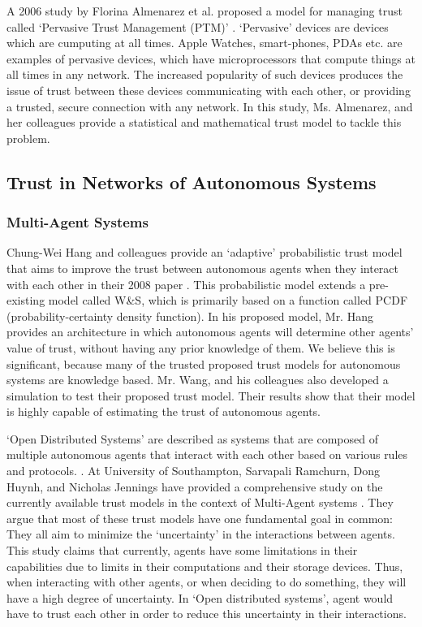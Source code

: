 \documentclass[runningheads,a4paper]{llncs}
\begin{document}
A 2006 study by Florina Almenarez et al. proposed a model for managing trust called `Pervasive Trust Management (PTM)' \cite{almenarez2006developing}. `Pervasive' devices are devices which are cumputing at all times. Apple Watches, smart-phones, PDAs etc. are examples of pervasive devices, which have microprocessors that compute things at all times in any network. The increased popularity of such devices produces the issue of trust between these devices communicating with each other, or providing a trusted, secure connection with any network. In this study, Ms. Almenarez, and her colleagues provide a statistical and mathematical trust model to tackle this problem.
\newpage
\subsection{Trust in Networks of Autonomous Systems}
\subsubsection{Multi-Agent Systems}
Chung-Wei Hang and colleagues provide an `adaptive' probabilistic trust model that aims to improve the trust between autonomous agents when they interact with each other in their 2008 paper \cite{hang2008adaptive}. This probabilistic model extends a pre-existing model called W\&S, which is primarily based on a function called PCDF (probability-certainty density
function). In his proposed model, Mr. Hang provides an architecture in which autonomous agents will determine other agents' value of trust, without having any prior  knowledge of them. We believe this is significant, because many of the trusted proposed trust models for autonomous systems are knowledge based. Mr. Wang, and his colleagues also developed a simulation to test their proposed trust model. Their results show that their model is highly capable of estimating the trust of autonomous agents.

`Open Distributed Systems' are described as systems that are composed of multiple autonomous agents that interact with each other based on various rules and protocols. \cite{ramchurn2004trust}. At University of Southampton, Sarvapali Ramchurn, Dong Huynh, and Nicholas Jennings have provided a comprehensive study on the currently available trust models in the context of Multi-Agent systems \cite{ramchurn2004trust}. They argue that most of these trust models have one fundamental goal in common: They all aim to minimize the `uncertainty' in the interactions between agents. This study claims that currently, agents have some limitations in their capabilities due to limits in their computations and their storage devices. Thus, when interacting with other agents, or when deciding to do something, they will have a high degree of uncertainty. In `Open distributed systems', agent would have to trust each other in order to reduce this uncertainty in their interactions.
\end{document}
